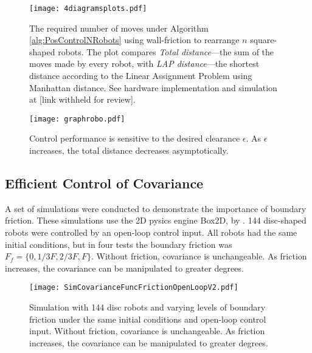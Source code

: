 \begin{figure}
\begin{center}
	\texttt{[image: 4diagramsplots.pdf]}
\end{center}
\caption{\label{fig:4diagramsplots.pdf}
The required number of moves under Algorithm \ref{alg:PosControlNRobots}  using wall-friction to rearrange $n$ square-shaped 
robots.  The plot compares  \emph{Total distance}---the sum of the moves made by every robot, with \emph{LAP distance}---the shortest distance according to the Linear Assignment Problem using Manhattan distance.  See hardware implementation and simulation at [link withheld for review].
}
\end{figure}

\begin{figure}
\begin{center}
	\texttt{[image: graphrobo.pdf]}
\end{center}
\caption{\label{fig:graphrobo.pdf}
Control performance is sensitive to the desired clearance $\epsilon$.  As $\epsilon$ increases, the total distance decreases asymptotically.
}
\end{figure}

\subsection{Efficient Control of Covariance}
A set of simulations were conducted to demonstrate the importance of boundary friction.  These simulations use  the 2D pysics engine Box2D, by \citet {Box2D}.
 144 disc-shaped robots were controlled by an open-loop control input.  All robots had  the same initial conditions, but in four tests the boundary friction was $F_f = \{0,1/3 F, 2/3F, F\}$.
 Without friction, covariance is unchangeable.  As friction increases, the covariance can be manipulated to greater degrees.


\begin{figure}
\begin{center}
	\texttt{[image: SimCovarianceFuncFrictionOpenLoopV2.pdf]}
\end{center}
\caption{\label{fig:SimCovarianceFuncFrictionOpenLoop}
Simulation with 144 disc robots and varying levels of boundary friction under the same initial conditions and open-loop control input.  Without friction, covariance is unchangeable.  As friction increases, the covariance can be manipulated to greater degrees.
}
\end{figure}




